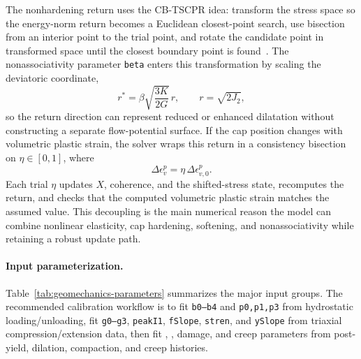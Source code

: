 The nonhardening return uses the CB-TSCPR idea: transform the stress space so the energy-norm return becomes a Euclidean closest-point search, use bisection from an interior point to the trial point, and rotate the candidate point in transformed space until the closest boundary point is found~\cite{homel2015cbtscpr}.  The nonassociativity parameter \texttt{beta} enters this transformation by scaling the deviatoric coordinate,
\begin{equation}
  r^* = \beta\sqrt{\frac{3K}{2G}}\,r,
  \qquad r=\sqrt{2J_2},
  \label{eq:geomechanics-transformed-space}
\end{equation}
so the return direction can represent reduced or enhanced dilatation without constructing a separate flow-potential surface.  If the cap position changes with volumetric plastic strain, the solver wraps this return in a consistency bisection on \(\eta\in[0,1]\), where
\begin{equation}
  \Delta\epsilon_v^p = \eta\,\Delta\epsilon_{v,0}^p.
  \label{eq:geomechanics-consistency-eta}
\end{equation}
Each trial \(\eta\) updates \(X\), coherence, and the shifted-stress state, recomputes the return, and checks that the computed volumetric plastic strain matches the assumed value.  This decoupling is the main numerical reason the model can combine nonlinear elasticity, cap hardening, softening, and nonassociativity while retaining a robust update path.

\paragraph{Input parameterization.}
Table~\ref{tab:geomechanics-parameters} summarizes the major input groups.  The recommended calibration workflow is to fit \texttt{b0--b4} and \texttt{p0,p1,p3} from hydrostatic loading/unloading, fit \texttt{g0--g3}, \texttt{peakI1}, \texttt{fSlope}, \texttt{stren}, and \texttt{ySlope} from triaxial compression/extension data, then fit , , damage, and creep parameters from post-yield, dilation, compaction, and creep histories.

